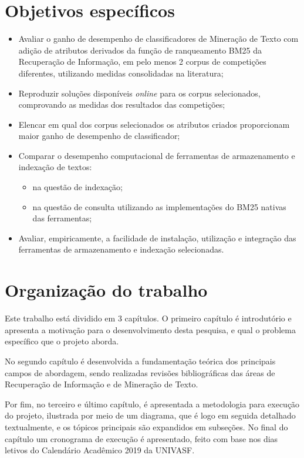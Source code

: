     \section{Objetivos específicos} \label{sec:Objetivos-específicos}
        \begin{itemize}
        	\item Avaliar o ganho de desempenho de classificadores de Mineração de Texto com adição de atributos derivados da função de ranqueamento BM25 da Recuperação de Informação, em pelo menos 2 corpus de competições diferentes, utilizando medidas consolidadas na literatura;
        	
        	\item Reproduzir soluções disponíveis \textit{online} para os corpus selecionados, comprovando as medidas dos resultados das competições;
        	
            \item Elencar em qual dos corpus selecionados os atributos criados proporcionam maior ganho de desempenho de classificador;
            
            \item Comparar o desempenho computacional de ferramentas de armazenamento e indexação de textos:
            \begin{itemize}
                \item na questão de indexação;
                \item na questão de consulta utilizando as implementações do BM25 nativas das ferramentas;
            \end{itemize}
            
            \item Avaliar, empiricamente, a facilidade de instalação, utilização e integração das ferramentas de armazenamento e indexação selecionadas.
        \end{itemize}
    
    \section{Organização do trabalho} \label{sec:Organização-do-trabalho}
        Este trabalho está dividido em 3 capítulos. O primeiro capítulo é introdutório e apresenta a motivação para o desenvolvimento desta pesquisa, e qual o problema específico que o projeto aborda.
        
        No segundo capítulo é desenvolvida a fundamentação teórica dos principais campos de abordagem, sendo realizadas revisões bibliográficas das áreas de Recuperação de Informação e de Mineração de Texto.
        
        Por fim, no terceiro e último capítulo, é apresentada a metodologia para execução do projeto, ilustrada por meio de um diagrama, que é logo em seguida detalhado textualmente, e os tópicos principais são expandidos em subseções.
        No final do capítulo um cronograma de execução é apresentado, feito com base nos dias letivos do Calendário Acadêmico 2019 da UNIVASF.
